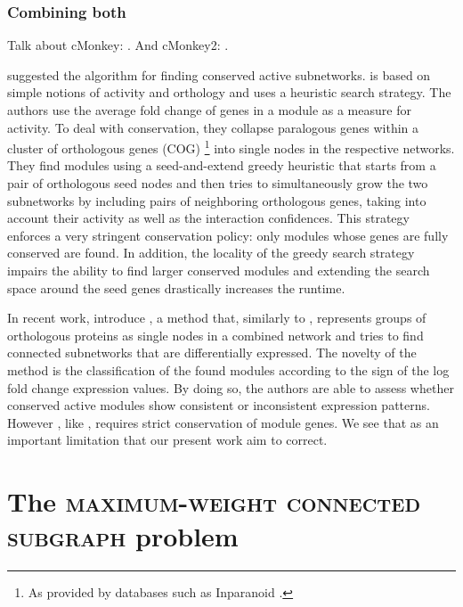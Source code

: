 	\subsubsection{Combining both}

		Talk about cMonkey: \parencite{reiss2006integrated}.
		And cMonkey2: \parencite{reiss2015cmonkey2}.

		\Textcite{deshpande2010scalable} suggested the \nexus{} algorithm for finding conserved active subnetworks.
		\nexus{} is based on simple notions of activity and orthology and uses a heuristic search strategy.
		The authors use the average fold change of genes in a module as a measure for activity.
		To deal with conservation, they collapse paralogous genes within a cluster of orthologous genes (COG) \parencite{tatusov1997genomic}\footnote{As provided by databases such as Inparanoid \parencite{obrien2005inparanoid}.} into single nodes in the respective networks.
		They find modules using a seed-and-extend greedy heuristic that starts from a pair of orthologous seed nodes and then tries to simultaneously grow the two subnetworks by including pairs of neighboring orthologous genes, taking into account their activity as well as the interaction confidences.
		This strategy enforces a very stringent conservation policy: only modules whose genes are fully conserved are found.
		In addition, the locality of the greedy search strategy impairs the ability to find larger conserved modules and extending the search space around the seed genes drastically increases the runtime.

		In recent work, \textcite{zinman2015moduleblast} introduce \moduleblast{}, a method that, similarly to \nexus{}, represents groups of orthologous proteins as single nodes in a combined network and tries to find connected subnetworks that are differentially expressed.
		The novelty of the method is the classification of the found modules according to the sign of the log fold change expression values.
		By doing so, the authors are able to assess whether conserved active modules show consistent or inconsistent
  expression patterns.
		However \moduleblast{}, like \nexus{}, requires strict conservation of module genes.
		We see that as an important limitation that our present work aim to correct.

\section{The \textsc{maximum-weight connected subgraph} problem}
\label{sec:mwcsproblem}


